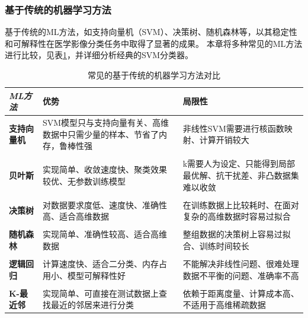 \subsubsection{基于传统的机器学习方法}
基于传统的ML方法，如支持向量机（SVM）、决策树、随机森林等，以其稳定性和可解释性在医学影像分类任务中取得了显著的成果。%
本章将多种常见的ML方法进行比较，见表\ref{ML_contrast}，并详细分析经典的SVM分类器。

   \begin{table}[htbp]
      \centering
          \caption{常见的基于传统的机器学习方法对比}\label{ML_contrast}     
            \begin{tabular}{m{3.2cm}<{\centering}m{4.2cm}<{\centering}m{4.2cm}<{\centering}}
            \hline
            \textbf{\textit{ML方法}}  &优势 &局限性  \\ \hline
            \textbf{支持向量机}  &SVM模型只与支持向量有关、高维数据中只需少量的样本、节省了内存，鲁棒性强  &非线性SVM需要进行核函数映射、计算开销较大  \\ \\
            \textbf{贝叶斯}	  &实现简单、收敛速度快、聚类效果较优、无参数训练模型  &k需要人为设定、只能得到局部最优解、抗干扰差、非凸数据集难以收敛  \\ \\
            \textbf{决策树}  &对数据要求度低、速度快、准确性高、适合高维数据  &在训练数据上比较耗时、在面对复杂的高维数据时容易过拟合  \\ \\
            \textbf{随机森林}    &实现简单、准确性较高、适合高维数据  &整组数据的决策树上容易过拟合、训练时间较长  \\ \\
            \textbf{逻辑回归} &计算速度快、适合二分类、内存占用小、模型可解释性好  &不能解决非线性问题、很难处理数据不平衡的问题、准确率不高  \\ \\ 
            \textbf{K-最近邻} &实现简单、可直接在测试数据上查找最近的邻居来进行分类 &依赖于距离度量、计算成本高、不适用于高维稀疏数据
             \\  \hline
            \end{tabular} 
    \end{table}
    
